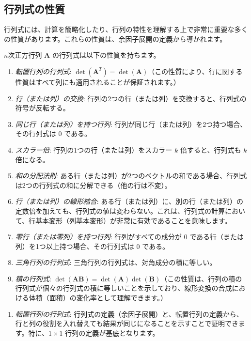 \subsection{行列式の性質}

行列式には、計算を簡略化したり、行列の特性を理解する上で非常に重要な多くの性質があります。これらの性質は、余因子展開の定義から導かれます。

\begin{thm}[行列式の性質] \label{determinant_property}
$n$次正方行列 $\bm{A}$ の行列式は以下の性質を持ちます。
\begin{enumerate}
    \item \emph{転置行列の行列式}: $\det(\bm{A}^T) = \det(\bm{A})$（この性質により、行に関する性質はすべて列にも適用されることが保証されます。）
    \item \emph{行（または列）の交換}: 行列の2つの行（または列）を交換すると、行列式の符号が反転する。
    \item \emph{同じ行（または列）を持つ行列}: 行列が同じ行（または列）を2つ持つ場合、その行列式は $0$ である。
    \item \emph{スカラー倍}: 行列の1つの行（または列）をスカラー $k$ 倍すると、行列式も $k$ 倍になる。
    \item \emph{和の分配法則}: ある行（または列）が2つのベクトルの和である場合、行列式は2つの行列式の和に分解できる（他の行は不変）。
    \item \emph{行（または列）の線形結合}: ある行（または列）に、別の行（または列）の定数倍を加えても、行列式の値は変わらない。これは、行列式の計算において、行基本変形（列基本変形）が非常に有効であることを意味します。
    \item \emph{零行（または零列）を持つ行列}: 行列がすべての成分が $0$ である行（または列）を1つ以上持つ場合、その行列式は $0$ である。
    \item \emph{三角行列の行列式}: 三角行列の行列式は、対角成分の積に等しい。
    \item \emph{積の行列式}: $\det(\bm{A}\bm{B}) = \det(\bm{A})\det(\bm{B})$（この性質は、行列の積の行列式が個々の行列式の積に等しいことを示しており、線形変換の合成における体積（面積）の変化率として理解できます。）
\end{enumerate}
\begin{proof*}
\begin{enumerate}
    \item \emph{転置行列の行列式}: 行列式の定義（余因子展開）と、転置行列の定義から、行と列の役割を入れ替えても結果が同じになることを示すことで証明できます。特に、$1 \times 1$ 行列の定義が基底となります。

\end{enumerate}
\end{proof*}
\end{thm}
